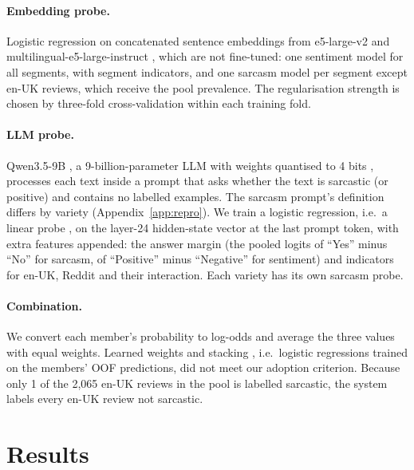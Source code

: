 \documentclass[11pt]{article}
\begin{document}
\paragraph{Embedding probe.} Logistic regression \citep{pedregosa2011sklearn} on concatenated sentence embeddings from
e5-large-v2 \citep{wang2022e5} and multilingual-e5-large-instruct \citep{wang2024me5}, which are not fine-tuned:
one sentiment model for all segments, with segment indicators, and one sarcasm model per segment except en-UK reviews, which receive the pool
prevalence. The regularisation
strength is chosen by three-fold cross-validation within each training fold.

\paragraph{LLM probe.} Qwen3.5-9B \citep{qwen35}, a 9-billion-parameter LLM with weights quantised to 4 bits
\citep{dettmers2023qlora}, processes each text inside a prompt that asks whether the text is sarcastic (or positive) and
contains no labelled examples. The sarcasm prompt's definition differs by variety (Appendix~\ref{app:repro}). We train a
logistic regression, i.e.\ a linear probe \citep{alain2017probes}, on the layer-24 hidden-state vector at the last prompt
token, with extra features appended: the answer margin (the pooled logits of ``Yes'' minus ``No'' for sarcasm, of ``Positive''
minus ``Negative'' for sentiment) and indicators for en-UK, Reddit and their interaction. Each variety has its own
sarcasm probe.

\paragraph{Combination.} We convert each member's probability to log-odds and average the three values with equal
weights. Learned weights and stacking \citep{wolpert1992stacked}, i.e.\ logistic regressions trained on
the members' OOF predictions, did not meet our adoption criterion. Because only 1 of the 2,065 en-UK reviews in the pool is labelled sarcastic, the system labels
every en-UK review not sarcastic.

\section{Results}
\label{sec:results}
\end{document}
